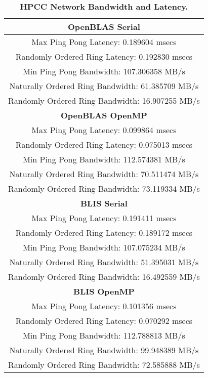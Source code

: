 \begin{table}[h]
\begin{center}
\begin{tabular}{ |c| } 
\hline
\textbf{OpenBLAS Serial} \\ 
\hline
Max Ping Pong Latency:                 0.189604 msecs \\
Randomly Ordered Ring Latency:         0.192830 msecs \\
Min Ping Pong Bandwidth:             107.306358 MB/s \\
Naturally Ordered Ring Bandwidth:     61.385709 MB/s \\
Randomly  Ordered Ring Bandwidth:     16.907255 MB/s \\
\hline
\textbf{OpenBLAS OpenMP} \\ 
\hline
Max Ping Pong Latency:                 0.099864 msecs \\
Randomly Ordered Ring Latency:         0.075013 msecs \\
Min Ping Pong Bandwidth:             112.574381 MB/s \\
Naturally Ordered Ring Bandwidth:     70.511474 MB/s \\
Randomly  Ordered Ring Bandwidth:     73.119334 MB/s \\
\hline
\textbf{BLIS Serial} \\ 
\hline
Max Ping Pong Latency:                 0.191411 msecs \\
Randomly Ordered Ring Latency:         0.189172 msecs \\
Min Ping Pong Bandwidth:             107.075234 MB/s \\
Naturally Ordered Ring Bandwidth:     51.395031 MB/s \\
Randomly  Ordered Ring Bandwidth:     16.492559 MB/s \\
\hline
\textbf{BLIS OpenMP} \\ 
\hline
Max Ping Pong Latency:                 0.101356 msecs \\
Randomly Ordered Ring Latency:         0.070292 msecs \\
Min Ping Pong Bandwidth:             112.788813 MB/s \\
Naturally Ordered Ring Bandwidth:     99.948389 MB/s \\
Randomly  Ordered Ring Bandwidth:     72.585888 MB/s \\
\hline
\end{tabular}
\end{center}
\caption{\label{tab:table-name}\textbf{HPCC Network Bandwidth and Latency.}}
\end{table}

